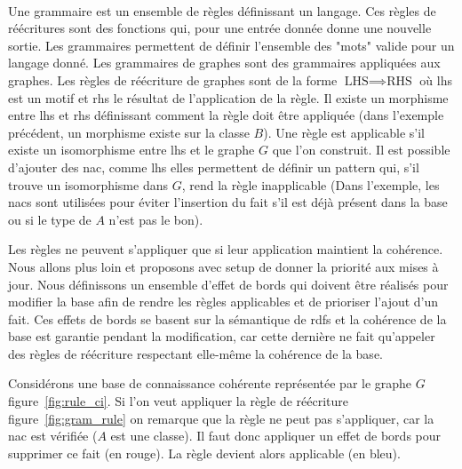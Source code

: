 \paragraph{}
Une grammaire est un ensemble de règles définissant un langage.
Ces règles de réécritures sont des fonctions qui, pour une entrée donnée donne une nouvelle sortie.
Les grammaires permettent de définir l'ensemble des "mots" valide pour un langage donné.
Les grammaires de graphes sont des grammaires appliquées aux graphes.
Les règles de réécriture de graphes sont de la forme $\text{LHS} \implies \text{RHS}$ où \gls{lhs} est un motif et \gls{rhs} le résultat de l'application de la règle.
Il existe un morphisme entre \gls{lhs} et \gls{rhs} définissant comment la règle doit être appliquée (dans l'exemple précédent, un morphisme existe sur la classe $B$).
Une règle est applicable s'il existe un isomorphisme entre \gls{lhs} et le graphe $G$ que l'on construit.
Il est possible d'ajouter des \gls{nac}, comme \gls{lhs} elles permettent de définir un pattern qui, s'il trouve un isomorphisme dans $G$, rend la règle inapplicable (Dans l'exemple, les \gls{nac}s sont utilisées pour éviter l'insertion du fait s'il est déjà présent dans la base ou si le type de $A$ n'est pas le bon).

Les règles ne peuvent s'appliquer que si leur application maintient la cohérence.
Nous allons plus loin et proposons avec \gls{setup} de donner la priorité aux mises à jour.
Nous définissons un ensemble d'effet de bords qui doivent être réalisés pour modifier la base afin de rendre les règles applicables et de prioriser l'ajout d'un fait.
Ces effets de bords se basent sur la sémantique de \gls{rdfs} et la cohérence de la base est garantie pendant la modification, car cette dernière ne fait qu'appeler des règles de réécriture respectant elle-même la cohérence de la base.

Considérons une base de connaissance cohérente représentée par le graphe $G$ figure~\ref{fig:rule_ci}.
Si l'on veut appliquer la règle de réécriture figure~\ref{fig:gram_rule} on remarque que la règle ne peut pas s'appliquer, car la \gls{nac} est vérifiée ($A$ est une classe).
Il faut donc appliquer un effet de bords pour supprimer ce fait (en rouge).
La règle devient alors applicable (en bleu).

